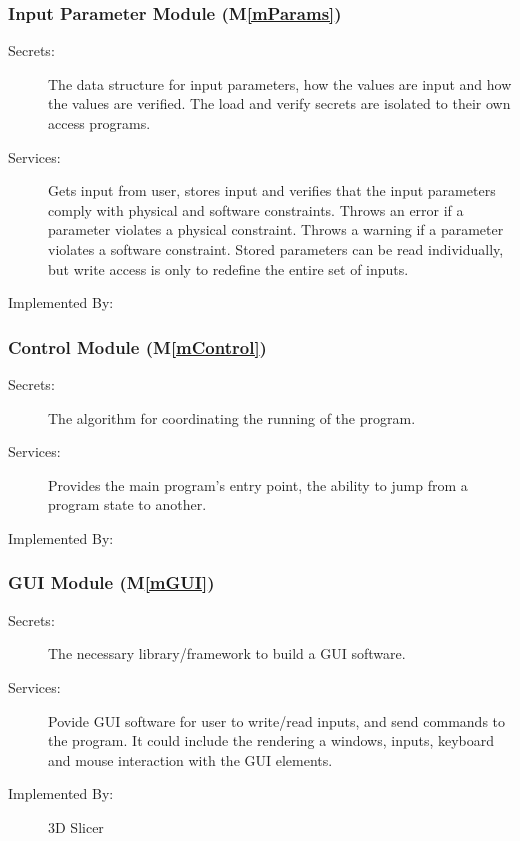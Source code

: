 \documentclass[12pt, titlepage]{article}
\newcommand{\mref}[1]{M\ref{#1}}
\begin{document}
\subsubsection{Input Parameter Module (\mref{mParams})}

\begin{description}
\item[Secrets:] The data structure for input parameters, how the
values are input and how the values are verified.  The load and verify secrets
are isolated to their own access programs.
\item[Services:] Gets input from user, stores input and verifies that the
  input parameters comply with physical and software constraints. Throws an
  error if a parameter violates a physical constraint. Throws a warning if a
  parameter violates a software constraint.  Stored parameters can be read
  individually, but write access is only to redefine the entire set of inputs.
\item[Implemented By:] \progname{}
\end{description}

\subsubsection{Control Module (\mref{mControl})}

\begin{description}
\item[Secrets:]The algorithm for coordinating the running of the program.
\item[Services:]Provides the main program's entry point, the ability to jump from a program state to another.
\item[Implemented By:] \progname
\end{description}

\subsubsection{GUI Module (\mref{mGUI})}
\begin{description}
\item[Secrets:]The necessary library/framework to build a GUI software.
\item[Services:]Povide GUI software for user to write/read inputs, and send commands to the program. It could include the rendering a windows, inputs, keyboard and mouse interaction with the GUI elements.
\item[Implemented By:] 3D Slicer
\end{description}
\end{document}
